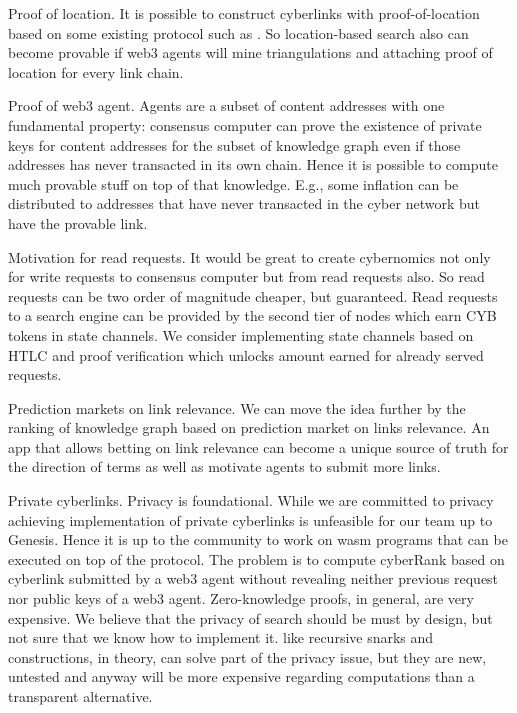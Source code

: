 \documentclass[8pt,oneside]{amsart}
\newcommand{\linkgreen}[2]{\href{#1}{\color{green}{#2}}}
\newcommand{\code}[1]{{\PlayBold #1}}
\begin{document}
\code{Proof of location}. It is possible to construct cyberlinks with proof-of-location based on some existing protocol such as \linkgreen{https://ipfs.io/ipfs/QmZYKGuLHf2h1mZrhiP2FzYsjj3tWt2LYduMCRbpgi5pKG}{Foam}. So location-based search also can become provable if web3 agents will mine triangulations and attaching proof of location for every link chain.

\code{Proof of web3 agent}. Agents are a subset of content addresses with one fundamental property: consensus computer can prove the existence of private keys for content addresses for the subset of knowledge graph even if those addresses has never transacted in its own chain. Hence it is possible to compute much provable stuff on top of that knowledge. E.g., some inflation can be distributed to addresses that have never transacted in the cyber network but have the provable link.

\code{Motivation for read requests}. It would be great to create cybernomics not only for write requests to consensus computer but from read requests also. So read requests can be two order of magnitude cheaper, but guaranteed. Read requests to a search engine can be provided by the second tier of nodes which earn CYB tokens in state channels. We consider implementing state channels based on HTLC and proof verification which unlocks amount earned for already served requests.

\code{Prediction markets on link relevance}. We can move the idea further by the ranking of knowledge graph based on prediction market on links relevance. An app that allows betting on link relevance can become a unique source of truth for the direction of terms as well as motivate agents to submit more links.

\code{Private cyberlinks}. Privacy is foundational. While we are committed to privacy achieving implementation of private cyberlinks is unfeasible for our team up to Genesis. Hence it is up to the community to work on wasm programs that can be executed on top of the protocol. The problem is to compute cyberRank based on cyberlink submitted by a web3 agent without revealing neither previous request nor public keys of a web3 agent. Zero-knowledge proofs, in general, are very expensive. We believe that the privacy of search should be must by design, but not sure that we know how to implement it. \linkgreen{https://ipfs.io/ipfs/Qmdje3AmtsfjX9edWAxo3LFhV9CTAXoUvwGR7wHJXnc2Gk}{Coda} like recursive snarks and \linkgreen{https://ipfs.io/ipfs/Qmd99xmraYip9cVv8gRMy6Y97Bkij8qUYArGDME7CzFasg}{mimblewimble} constructions, in theory, can solve part of the privacy issue, but they are new, untested and anyway will be more expensive regarding computations than a transparent alternative.
\end{document}
